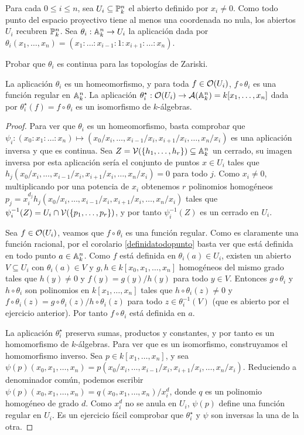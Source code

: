 \documentclass[ACGA.tex]{subfiles}
\begin{document}
Para cada $0\leq i\leq n$, sea $U_i\subseteq\mathbb{P}^n_k$ el abierto definido por $x_i\neq 0$. Como todo punto del espacio proyectivo tiene al menos una coordenada no nula, los abiertos $U_i$ recubren $\mathbb{P}^n_k$. Sea $\theta_i:\mathbb{A}^n_k\to U_i$ la aplicación dada por $\theta_i(x_1,\ldots,x_n)=(x_1:\ldots:x_{i-1}:1:x_{i+1}:\ldots:x_n)$.

\begin{ejer}
 Probar que $\theta_i$ es continua para las topologías de Zariski.
\end{ejer}


\begin{prop}
 La aplicación $\theta_i$ es un homeomorfismo, y para toda $f\in{\mathcal O}(U_i)$, $f\circ\theta_i$ es una función regular en $\mathbb{A}^n_k$. La aplicación $\theta_i^\star:{\mathcal O}(U_i)\to\mathcal{A}(\mathbb{A}^n_k)=k[x_1,\ldots,x_n]$ dada por $\theta_i^\star(f)=f\circ\theta_i$ es un isomorfismo de $k$-álgebras.
\end{prop}

\begin{proof}
 Para ver que $\theta_i$ es un homeomorfismo, basta comprobar que $\psi_i:(x_0:x_1:\ldots:x_n)\mapsto (x_0/x_i,\ldots,x_{i-1}/x_i,x_{i+1}/x_i,\ldots,x_n/x_i)$ es una aplicación inversa y que es continua. Sea $Z=\mathcal{V}(\{h_1,\ldots,h_r\})\subseteq\mathbb{A}^n_k$ un cerrado, su imagen inversa por esta aplicación sería el conjunto de puntos $x\in U_i$ tales que $h_j(x_0/x_i,\ldots,x_{i-1}/x_i,x_{i+1}/x_i,\ldots,x_n/x_i)=0$ para todo $j$. Como $x_i\neq 0$, multiplicando por una potencia de $x_i$ obtenemos $r$ polinomios homogéneos $p_j=x_i^{d_j}h_j(x_0/x_i,\ldots,x_{i-1}/x_i,x_{i+1}/x_i,\ldots,x_n/x_i)$ tales que $\psi_i^{-1}(Z)=U_i\cap \mathcal{V}(\{p_1,\ldots,p_r\})$, y por tanto $\psi_i^{-1}(Z)$ es un cerrado en $U_i$.

 Sea $f\in{\mathcal O}(U_i)$, veamos que $f\circ\theta_i$ es una función regular. Como es claramente una función racional, por el corolario \ref{definidatodopunto} basta ver que está definida en todo punto $a\in\mathbb{A}^n_k$. Como $f$ está definida en $\theta_i(a)\in U_i$, existen un abierto $V\subseteq U_i$ con $\theta_i(a)\in V$ y $g,h\in k[x_0,x_1,\ldots,x_n]$ homogéneos del mismo grado tales que $h(y)\neq 0$ y $f(y)=g(y)/h(y)$ para todo $y\in V$. Entonces $g\circ\theta_i$ y $h\circ\theta_i$ son polinomios en $k[x_1,\ldots,x_n]$ tales que $h\circ\theta_i(z)\neq 0$ y $f\circ\theta_i(z)=g\circ\theta_i(z)/h\circ\theta_i(z)$ para todo $z\in\theta_i^{-1}(V)$ (que es abierto por el ejercicio anterior). Por tanto $f\circ\theta_i$ está definida en $a$.

La aplicación $\theta_i^\star$ preserva sumas, productos y constantes, y por tanto es un homomorfismo de $k$-álgebras. Para ver que es un isomorfismo, construyamos el homomorfismo inverso. Sea $p\in k[x_1,\ldots,x_n]$, y sea $\psi(p)(x_0,x_1,\ldots,x_n)=p(x_0/x_i,\ldots,x_{i-1}/x_i,x_{i+1}/x_i,\ldots,x_n/x_i)$. Reduciendo a denominador común, podemos escribir $\psi(p)(x_0,x_1,\ldots,x_n)=q(x_0,x_1,\ldots,x_n)/x^d_i$, donde $q$ es un polinomio homogéneo de grado $d$. Como $x^d_i$ no se anula en $U_i$, $\psi(p)$ define una función regular en $U_i$. Es un ejercicio fácil comprobar que $\theta_i^\star$ y $\psi$ son inversas la una de la otra.
\end{proof}
\end{document}

